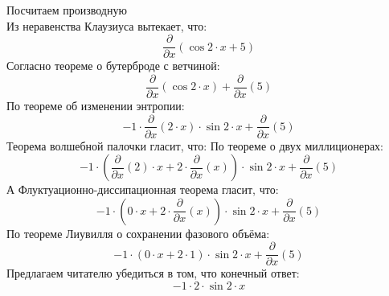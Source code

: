 \documentclass[12pt]{article}
\begin{document}
\newpage                                                  
\Huge                                                     
	Посчитаем производную\\                                
\newline                                                  
\normalfont                                               
\normalsize                                               
Из неравенства Клаузиуса вытекает, что:  \begin{equation}
	\frac{\partial}{\partial x}\left( \cos {2\cdot x} + 5\right) 
\end{equation}
Согласно теореме о бутерброде с ветчиной:  \begin{equation}
	\frac{\partial}{\partial x}\left( \cos {2\cdot x}\right)  + \frac{\partial}{\partial x}\left( 5\right) 
\end{equation}
По теореме об изменении энтропии:  \begin{equation}
	-1\cdot \frac{\partial}{\partial x}\left( 2\cdot x\right) \cdot \sin {2\cdot x} + \frac{\partial}{\partial x}\left( 5\right) 
\end{equation}
Теорема волшебной палочки гласит, что: По теореме о двух миллиционерах:  \begin{equation}
	-1\cdot \left( \frac{\partial}{\partial x}\left( 2\right) \cdot x + 2\cdot \frac{\partial}{\partial x}\left( x\right) \right) \cdot \sin {2\cdot x} + \frac{\partial}{\partial x}\left( 5\right) 
\end{equation}
А Флуктуационно-диссипационная теорема гласит, что:  \begin{equation}
	-1\cdot \left( 0\cdot x + 2\cdot \frac{\partial}{\partial x}\left( x\right) \right) \cdot \sin {2\cdot x} + \frac{\partial}{\partial x}\left( 5\right) 
\end{equation}
По теореме Лиувилля о сохранении фазового объёма:  \begin{equation}
	-1\cdot \left( 0\cdot x + 2\cdot 1\right) \cdot \sin {2\cdot x} + \frac{\partial}{\partial x}\left( 5\right) 
\end{equation}
Предлагаем читателю убедиться в том, что конечный ответ: 
\begin{equation}
	-1\cdot 2\cdot \sin {2\cdot x}
\end{equation}
\end{document}
